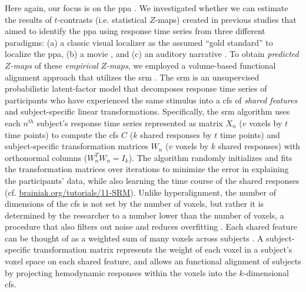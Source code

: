 Here again, our focus is on the \ac{ppa} \citep[e.g.,][for
reviews]{epstein2014neural, aminoff2013role}.
%
We investigated whether we can estimate the results of $t$-contrasts (i.e.
statistical $Z$-maps) created in previous studies that aimed to identify the
\ac{ppa} using response time series from three different paradigms:
%
(a) a classic visual localizer \citep{sengupta2016extension} as the assumed
``gold standard'' to localize the \ac{ppa},
%
(b) a movie \citep{haeusler2022processing}, and
%
(c) an auditory narrative \citep{haeusler2022processing}.
%
To obtain \textit{predicted $Z$-maps} of these \textit{empirical $Z$-maps}, we
employed a volume-based functional alignment approach that utilizes the \ac{srm}
\citep{chen2015reduced, richard2019fast}.
The \ac{srm} is an unsupervised probabilistic latent-factor model that
decomposes response time series of participants who have experienced the same
stimulus into a \ac{cfs} of \textit{shared features} \citep[also known as
\textit{shared feature space};][]{chen2015reduced} and subject-specific linear
transformations.
Specifically, the \ac{srm} algorithm uses each $n^{th}$ subject's response time
series represented as matrix $X_{n}$ ({$v$} voxels by $t$ time points) to
compute the \ac{cfs} $C$ ($k$ shared responses by $t$ time points) and
subject-specific transformation matrices $W_{n}$ ($v$ voxels by $k$ shared
responses) with orthonormal columns ($W_{n}^{T}W_{n}=I_{k}$).
The algorithm randomly initializes and fits the transformation matrices over
iterations to minimize the error in explaining the participants' data, while
also learning the time course of the shared responses (cf.
\href{https://brainiak.org/tutorials/11-SRM/}{\url{brainiak.org/tutorials/11-SRM}}).
Unlike hyperalignment, the number of dimensions of the \ac{cfs} is not set by
the number of voxels, but rather it is determined by the researcher to a number
lower than the number of voxels, a procedure that also filters out noise and
reduces overfitting \citep{chen2015reduced}.
Each shared feature can be thought of as a weighted sum of many voxels across
subjects \citep{kumar2020brainiak}.
A subject-specific transformation matrix represents the weight of each voxel in
a subject's voxel space on each shared feature, and allows an functional
alignment of subjects by projecting hemodynamic responses within the voxels into
the $k$-dimensional \ac{cfs}.

